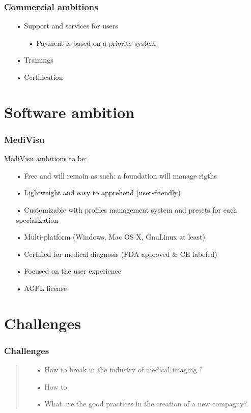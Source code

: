 \documentclass[11pt]{beamer}
\begin{document}
\begin{frame}
\frametitle{Commercial ambitions}
\begin{itemize}[<+->]
\item[•] Support and services for users
\begin{itemize}[<+->]
\item[•] Payment is based on a priority system
\end{itemize}
\item[•] Trainings
\item[•] Certification
\end{itemize}
\end{frame}

\section{Software ambition}

\begin{frame}
\frametitle{MediVisu}
MediVisu ambitions to be:
\begin{itemize}[<+->]
\item[•] Free and will remain as such: a foundation will manage rigths
\item[•] Lightweight and easy to apprehend (user-friendly)
\item[•] Customizable with profiles management system and presets for each specialization
\item[•] Multi-platform (Windows, Mac OS X, GnuLinux at least)
\item[•] Certified for medical diagnosis (FDA approved \& CE labeled)
\item[•] Focused on the user experience
\item[•] AGPL license
\end{itemize}
\end{frame}

\section{Challenges}

\begin{frame}
\frametitle{Challenges}
\begin{quote}
\begin{itemize}[<+->]
\item[•] How to break in the industry of medical imaging ?
\item[•] How to 
\item[•] What are the good practices in the creation of a new compagny?
\end{itemize}
\end{quote}
\end{frame}
\end{document}
